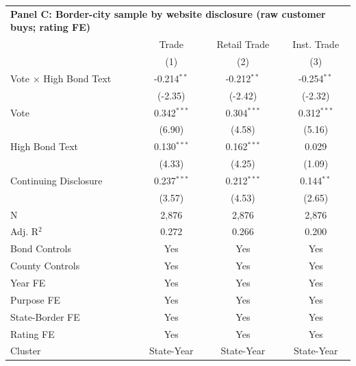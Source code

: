 \begingroup
\centering
\begin{tabular*}{\textwidth}{@{\extracolsep{\fill}}lccc}
\multicolumn{5}{l}{\textbf{Panel C: Border-city sample by website disclosure (raw customer buys; rating FE)}}\\

\addlinespace
   \toprule
                                 & Trade         & Retail Trade  & Inst. Trade\\  
                                 & (1)           & (2)           & (3)\\  
   \midrule 
   Vote $\times$ High Bond Text  & -0.214$^{**}$ & -0.212$^{**}$ & -0.254$^{**}$\\   
                                 & (-2.35)      & (-2.42)      & (-2.32)\\   
   Vote                          & 0.342$^{***}$ & 0.304$^{***}$ & 0.312$^{***}$\\   
                                 & (6.90)       & (4.58)       & (5.16)\\   
   High Bond Text                & 0.130$^{***}$ & 0.162$^{***}$ & 0.029\\   
                                 & (4.33)       & (4.25)       & (1.09)\\   
   Continuing Disclosure         & 0.237$^{***}$ & 0.212$^{***}$ & 0.144$^{**}$\\   
                                 & (3.57)       & (4.53)       & (2.65)\\   
   \hline
   N                  & 2,876         & 2,876         & 2,876\\  
   Adj. R$^2$                & 0.272         & 0.266         & 0.200\\  
   Bond Controls                 & Yes           & Yes           & Yes\\  
   County Controls               & Yes           & Yes           & Yes\\  
   Year FE                       & Yes           & Yes           & Yes\\  
   Purpose FE                    & Yes           & Yes           & Yes\\  
   State-Border FE               & Yes           & Yes           & Yes\\  
   Rating FE                     & Yes           & Yes           & Yes\\  
   Cluster              & State-Year & State-Year & State-Year\\  
   \bottomrule
\end{tabular*}
\par\endgroup
